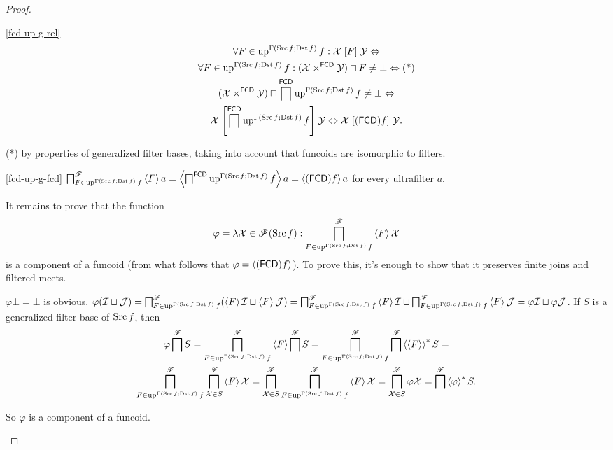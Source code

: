\begin{proof}
~
\begin{widedisorder}
\item [{\ref{fcd-up-g-rel}}] ~
\begin{multline*}
\forall F\in\operatorname{up}^{\Gamma(\operatorname{Src} f;\operatorname{Dst} f)}f:\mathcal{X}\mathrel{\left[F\right]}\mathcal{Y}\Leftrightarrow\\
\forall F\in\operatorname{up}^{\Gamma(\operatorname{Src} f;\operatorname{Dst} f)}f:(\mathcal{X}\times^{\mathsf{FCD}}\mathcal{Y})\sqcap F\ne\bot\Leftrightarrow\text{(*)}\\
(\mathcal{X}\times^{\mathsf{FCD}}\mathcal{Y})\sqcap \bigsqcap^{\mathsf{FCD}}\operatorname{up}^{\Gamma(\operatorname{Src} f;\operatorname{Dst} f)}f\ne\bot\Leftrightarrow\\
\mathcal{X}\mathrel{\left[\bigsqcap^{\mathsf{FCD}}\operatorname{up}^{\Gamma(\operatorname{Src} f;\operatorname{Dst} f)}f\right]}\mathcal{Y}\Leftrightarrow\mathcal{X}\mathrel{\left[(\mathsf{FCD}) f\right]}\mathcal{Y}.
\end{multline*}



({*}) by properties of generalized filter bases, taking into account
that funcoids are isomorphic to filters.

\item [{\ref{fcd-up-g-fcd}}] $\bigsqcap_{F\in\operatorname{up}^{\Gamma(\operatorname{Src} f;\operatorname{Dst} f)}f}^{\mathscr{F}}\left\langle F\right\rangle a=\left\langle \bigsqcap^{\mathsf{FCD}}\operatorname{up}^{\Gamma(\operatorname{Src} f;\operatorname{Dst} f)}f\right\rangle a=\left\langle (\mathsf{FCD}) f\right\rangle a$
for every ultrafilter $a$.


It remains to prove that the function 
\[
\varphi=\lambda\mathcal{X}\in\mathscr{F}(\operatorname{Src} f):\bigsqcap_{F\in\operatorname{up}^{\Gamma(\operatorname{Src} f;\operatorname{Dst} f)}f}^{\mathscr{F}}\left\langle F\right\rangle\mathcal{X}
\]
is a component of a funcoid (from what follows that $\varphi=\left\langle (\mathsf{FCD}) f\right\rangle$).
To prove this, it's enough to show that it preserves finite joins
and filtered meets.


$\varphi\bot=\bot$ is obvious. $\varphi(\mathcal{I}\sqcup\mathcal{J})=\bigsqcap_{F\in\operatorname{up}^{\Gamma(\operatorname{Src} f;\operatorname{Dst} f)}f}^{\mathscr{F}}(\left\langle F\right\rangle\mathcal{I}\sqcup\left\langle F\right\rangle\mathcal{J})=\bigsqcap_{F\in\operatorname{up}^{\Gamma(\operatorname{Src} f;\operatorname{Dst} f)}f}^{\mathscr{F}}\left\langle F\right\rangle\mathcal{I}\sqcup\bigsqcap_{F\in\operatorname{up}^{\Gamma(\operatorname{Src} f;\operatorname{Dst} f)}f}^{\mathscr{F}}\left\langle F\right\rangle\mathcal{J}=\varphi\mathcal{I}\sqcup\varphi\mathcal{J}$.
If $S$ is a generalized filter base of $\operatorname{Src} f$, then 
\begin{multline*}
\varphi\bigsqcap^{\mathscr{F}}S=\bigsqcap_{F\in\operatorname{up}^{\Gamma(\operatorname{Src} f;\operatorname{Dst} f)}f}^{\mathscr{F}}\left\langle F\right\rangle\bigsqcap^{\mathscr{F}}S=\bigsqcap_{F\in\operatorname{up}^{\Gamma(\operatorname{Src} f;\operatorname{Dst} f)}f}^{\mathscr{F}}\bigsqcap^{\mathscr{F}}\left\langle \left\langle F\right\rangle\right\rangle ^{\ast}S=\\
\bigsqcap_{F\in\operatorname{up}^{\Gamma(\operatorname{Src} f;\operatorname{Dst} f)}f}^{\mathscr{F}}\bigsqcap_{\mathcal{X}\in S}^{\mathscr{F}}\left\langle F\right\rangle\mathcal{X}=\bigsqcap_{\mathcal{X}\in S}^{\mathscr{F}}\bigsqcap_{F\in\operatorname{up}^{\Gamma(\operatorname{Src} f;\operatorname{Dst} f)}f}^{\mathscr{F}}\left\langle F\right\rangle\mathcal{X}=\bigsqcap_{\mathcal{X}\in S}^{\mathscr{F}}\varphi\mathcal{X}=\bigsqcap^{\mathscr{F}}\left\langle \varphi\right\rangle ^{\ast}S.
\end{multline*}



So $\varphi$ is a component of a funcoid.

\end{widedisorder}
\end{proof}
